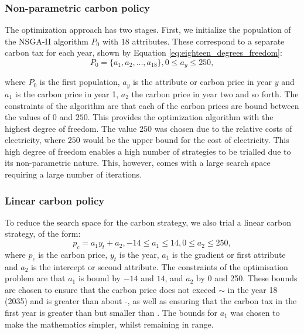 \label{ssec:optimization}
\subsubsection{Non-parametric carbon policy}
\label{sssec:non_parametric_strategy}
The optimization approach has two stages. First, we initialize the population of the NSGA-II algorithm $P_0$ with 18 attributes. These correspond to a separate carbon tax for each year, shown by Equation \ref{eq:eighteen_degrees_freedom}:
\begin{equation}
\label{eq:eighteen_degrees_freedom}
P_0=\{a_1,a_2,\ldots,a_{18}\}, 0\leq a_y\leq 250,
\end{equation} 

\noindent where $P_0$ is the first population, $a_y$ is the attribute or carbon price in year $y$ and $a_1$ is the carbon price in year 1, $a_2$ the carbon price in year two and so forth. The constraints of the algorithm are that each of the carbon prices are bound between the values of \textsterling$0$ and \textsterling$250$. This provides the optimization algorithm with the highest degree of freedom. The value \textsterling$250$ was chosen due to the relative costs of electricity, where \textsterling$250$ would be the upper bound for the cost of electricity. This high degree of freedom enables a high number of strategies to be trialled due to its non-parametric nature. This, however, comes with a large search space requiring a large number of iterations. 


\subsubsection{Linear carbon policy}
\label{sssec:linear_carbon_strategy}
To reduce the search space for the carbon strategy, we also trial a linear carbon strategy, of the form:
\begin{equation}
p_c=a_1y_t+a_2, -14 \leq a_1\leq 14, 0 \leq a_2\leq 250,
\end{equation}
\noindent where $p_c$ is the carbon price, $y_t$ is the year, $a_1$ is the gradient or first attribute and $a_2$ is the intercept or second attribute. The constraints of the optimisation problem are that $a_1$ is bound by $-14$ and $14$, and $a_2$ by 0 and 250. These bounds are chosen to ensure that the carbon price does not exceed ${\sim}$ in the year 18 (2035) and is greater than about -, as well as ensuring that the carbon tax in the first year is greater than  but smaller than . The bounds for $a_1$ was chosen to make the mathematics simpler, whilst remaining in range.

